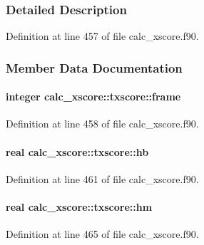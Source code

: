 \subsubsection{Detailed Description}


Definition at line 457 of file calc\-\_\-xscore.\-f90.



\subsubsection{Member Data Documentation}
\hypertarget{structcalc__xscore_1_1txscore_abe00c92b236f3bfb296ca40be8b22980}{
\paragraph[{frame}]{\setlength{\rightskip}{0pt plus 5cm}integer calc\-\_\-xscore\-::txscore\-::frame}}\label{structcalc__xscore_1_1txscore_abe00c92b236f3bfb296ca40be8b22980}


Definition at line 458 of file calc\-\_\-xscore.\-f90.

\hypertarget{structcalc__xscore_1_1txscore_a3c70f31323075f2b0aea07d81ed49e1b}{
\paragraph[{hb}]{\setlength{\rightskip}{0pt plus 5cm}real calc\-\_\-xscore\-::txscore\-::hb}}\label{structcalc__xscore_1_1txscore_a3c70f31323075f2b0aea07d81ed49e1b}


Definition at line 461 of file calc\-\_\-xscore.\-f90.

\hypertarget{structcalc__xscore_1_1txscore_a9c6f0f0449fac48b9a0a200c385afd3d}{
\paragraph[{hm}]{\setlength{\rightskip}{0pt plus 5cm}real calc\-\_\-xscore\-::txscore\-::hm}}\label{structcalc__xscore_1_1txscore_a9c6f0f0449fac48b9a0a200c385afd3d}


Definition at line 465 of file calc\-\_\-xscore.\-f90.

